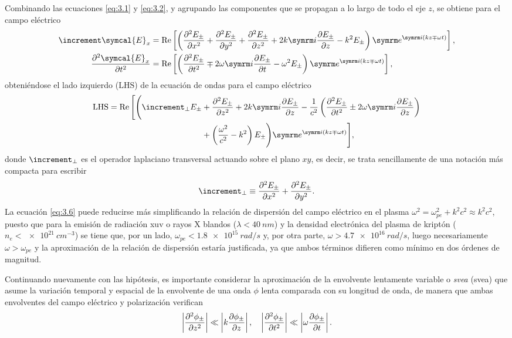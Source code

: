 Combinando las ecuaciones \eqref{eq:3.1} y \eqref{eq:3.2}, y agrupando las componentes que se propagan a lo largo de todo el eje $z$, se obtiene para el campo eléctrico
\begin{align}
  \laplacian \symcal{E}_{x} 
  &= 
  \RE \left[\left(\pdvN{E_{\pm }}{x}{2} + \pdvN{E_{\pm }}{y}{2} + \pdvN{E_{\pm }}{z}{2} + 2k \iu \pdv{E_{\pm }}{z} - k^{2}E_{\pm }\right)\eu^{\iu (kz \mp \omega t)}\right], \\
  \pdvN{\symcal{E}_{x}}{t}{2}
  &= 
  \RE \left[\left(\pdvN{E_{\pm }}{t}{2} \mp 2 \omega \iu \pdv{E_{\pm }}{t} - \omega^{2}E_{\pm }\right)\eu^{\iu (kz \mp \omega t)}\right],
\end{align}
obteniéndose el lado izquierdo ($\mathrm{LHS}$) de la ecuación de ondas para el campo eléctrico
\begin{equation}\label{eq:3.6}
  \begin{split}
    \mathrm{LHS} = \RE \Bigg[\Bigg(\laplacian_{\perp}E_{\pm} &+ \pdvN{E_{\pm }}{z}{2} + 2k \iu \pdv{E_{\pm }}{z} - \frac{1}{c^{2}}\left(\pdvN{E_{\pm }}{t}{2} \pm 2 \omega \iu \pdv{E_{\pm }}{z}\right) \\ &+  \left(\frac{\omega^{2}}{c^{2}} - k^{2}\right)E_{\pm }\Bigg)\eu^{\iu(kz \mp \omega t)}\Bigg],
  \end{split}
\end{equation}
donde $\laplacian_{\perp}$ es el operador laplaciano transversal actuando sobre el plano $xy$, es decir, se trata sencillamente de una notación más compacta para escribir 
\begin{equation*}
    \laplacian_{\perp} \equiv \pdvN{E_{\pm }}{x}{2} + \pdvN{E_{\pm }}{y}{2}.
\end{equation*}
La ecuación \eqref{eq:3.6} puede reducirse más simplificando la relación de dispersión del campo eléctrico en el plasma $\omega^{2} = \omega^{2}_{pe} + k^{2}c^{2}\approx k^{2}c^{2}$, puesto que para la emisión de radiación \acrshort{xuv} o rayos X blandos ($\lambda<\qty{40}{nm}$) y la densidad electrónica del plasma de kriptón ($n_e<\qty{e21}{cm^{-3}}$) se tiene que, por un lado, $\omega_{pe}<\qty{1,8e15}{rad/s}$ y, por otra parte, $\omega>\qty{4,7e16}{rad/s}$, luego necesariamente $\omega>\omega_{pe}$ y la aproximación de la relación de dispersión estaría justificada, ya que ambos términos difieren como mínimo en dos órdenes de magnitud. 

Continuando nuevamente con las hipótesis, es importante considerar la aproximación de la envolvente lentamente variable o \emph{\acrlong{svea}} (\acrshort{svea}) que asume la variación temporal y espacial de la envolvente de una onda $\phi$ lenta\autocite{Larroche2000} comparada con su longitud de onda, de manera que ambas envolventes del campo eléctrico y polarización verifican
\begin{equation}
  \left|\frac{\partial^{2}\phi_{\pm }}{\partial{z}^{2}}\right| \ll \left|k \frac{\partial\phi_{\pm }}{\partial z}\right|, \quad 
  \left|\frac{\partial^{2}\phi_{\pm }}{\partial{t}^{2}}\right| \ll \left|\omega \frac{\partial\phi_{\pm }}{\partial t}\right|.
\end{equation}

